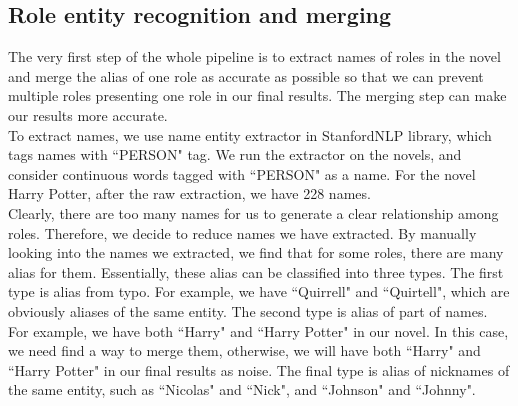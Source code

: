 \documentclass[11pt]{article}
\begin{document}
\subsection{Role entity recognition and merging} %

The very first step of the whole pipeline is to extract names of roles in the novel and merge the alias of one role as accurate as possible so that we can prevent multiple roles presenting one role in our final results. The merging step can make our results more accurate. \\

To extract names, we use name entity extractor in StanfordNLP library, which tags names with ``PERSON" tag. We run the extractor on the novels, and consider continuous words tagged with ``PERSON" as a name. For the novel Harry Potter, after the raw extraction, we have 228 names. \\

Clearly, there are too many names for us to generate a clear relationship among roles. Therefore, we decide to reduce names we have extracted. By manually looking into the names we extracted, we find that for some roles, there are many alias for them. Essentially, these alias can be classified into three types. The first type is alias from typo. For example, we have ``Quirrell" and ``Quirtell", which are obviously aliases of the same entity. The second type is alias of part of names. For example, we have both ``Harry" and ``Harry Potter" in our novel. In this case, we need find a way to merge them, otherwise, we will have both ``Harry" and ``Harry Potter" in our final results as noise. The final type is alias of nicknames of the same entity, such as ``Nicolas" and ``Nick", and ``Johnson" and ``Johnny". \\
\end{document}
